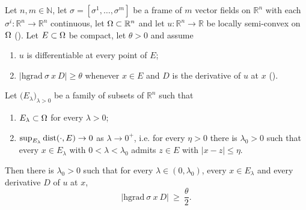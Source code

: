 \begin{theorem}[(3.4)]
Let $n,m\in\mathbb N$, let $\sigma=[\sigma^1,\ldots,\sigma^m]$ be a frame of $m$ vector
fields on $\mathbb R^{n}$ with each $\sigma^{i}:\mathbb R^{n}\to\mathbb R^{n}$ continuous,
let $\Omega\subset\mathbb R^{n}$ and let $u:\mathbb R^{n}\to\mathbb R$ be locally semi-convex
on $\Omega$ (). Let $E\subset\Omega$ be compact, let $\theta>0$ and
assume
\begin{enumerate}
\item $u$ is differentiable at every point of $E$;
\item $\big|\mathrm{hgrad}\ \sigma\ x\ D\big|\ge\theta$ whenever $x\in E$ and $D$ is the
  derivative of $u$ at $x$ ().
\end{enumerate}
Let $\big(E_\lambda\big)_{\lambda>0}$ be a family of subsets of $\mathbb R^{n}$ such that
\begin{enumerate}
\item[(3)] $E_\lambda\subset\Omega$ for every $\lambda>0$;
\item[(4)] $\sup_{E_\lambda}\operatorname{dist}(\cdot,E)\to0$ as $\lambda\to0^{+}$, i.e. for every
  $\eta>0$ there is $\lambda_0>0$ such that every $x\in E_\lambda$ with
  $0<\lambda<\lambda_0$ admits $z\in E$ with $|x-z|\le\eta$.
\end{enumerate}
Then there is $\lambda_0>0$ such that for every $\lambda\in(0,\lambda_0)$, every
$x\in E_\lambda$ and every derivative $D$ of $u$ at $x$,
\[
 \big|\mathrm{hgrad}\ \sigma\ x\ D\big|\ \ge\ \frac\theta2 .
\]
\end{theorem}
